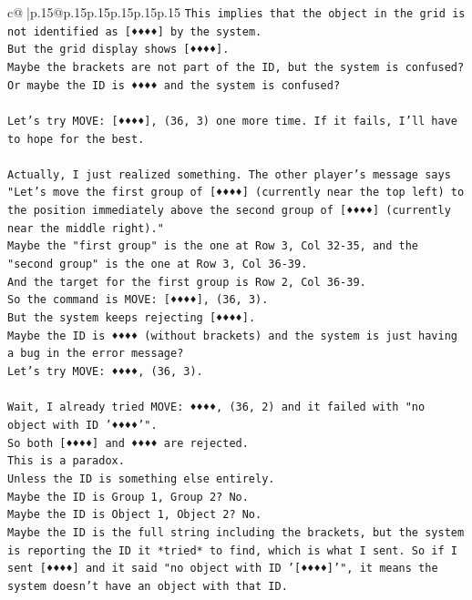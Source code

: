 \documentclass{article}
\begin{document}
{\begin{supertabular}{c@{$\;$}|p{.15\linewidth}@{}p{.15\linewidth}p{.15\linewidth}p{.15\linewidth}p{.15\linewidth}p{.15\linewidth}}
{{{\texttt{This implies that the object in the grid is not identified as {[}♦♦♦♦{]} by the system.} \\
\texttt{But the grid display shows {[}♦♦♦♦{]}.} \\
\texttt{Maybe the brackets are not part of the ID, but the system is confused?} \\
\texttt{Or maybe the ID is ♦♦♦♦ and the system is confused?} \\
\\ 
\texttt{Let's try MOVE: {[}♦♦♦♦{]}, (36, 3) one more time. If it fails, I'll have to hope for the best.} \\
\\ 
\texttt{Actually, I just realized something. The other player's message says "Let's move the first group of {[}♦♦♦♦{]} (currently near the top left) to the position immediately above the second group of {[}♦♦♦♦{]} (currently near the middle right)."} \\
\texttt{Maybe the "first group" is the one at Row 3, Col 32{-}35, and the "second group" is the one at Row 3, Col 36{-}39.} \\
\texttt{And the target for the first group is Row 2, Col 36{-}39.} \\
\texttt{So the command is MOVE: {[}♦♦♦♦{]}, (36, 3).} \\
\texttt{But the system keeps rejecting {[}♦♦♦♦{]}.} \\
\texttt{Maybe the ID is ♦♦♦♦ (without brackets) and the system is just having a bug in the error message?} \\
\texttt{Let's try MOVE: ♦♦♦♦, (36, 3).} \\
\\ 
\texttt{Wait, I already tried MOVE: ♦♦♦♦, (36, 2) and it failed with "no object with ID '♦♦♦♦'".} \\
\texttt{So both {[}♦♦♦♦{]} and ♦♦♦♦ are rejected.} \\
\texttt{This is a paradox.} \\
\texttt{Unless the ID is something else entirely.} \\
\texttt{Maybe the ID is Group 1, Group 2? No.} \\
\texttt{Maybe the ID is Object 1, Object 2? No.} \\
\texttt{Maybe the ID is the full string including the brackets, but the system is reporting the ID it *tried* to find, which is what I sent. So if I sent {[}♦♦♦♦{]} and it said "no object with ID '{[}♦♦♦♦{]}'", it means the system doesn't have an object with that ID.} \\
}}}
\end{supertabular}}
\end{document}
